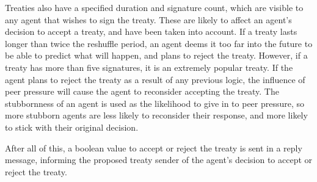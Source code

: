 Treaties also have a specified duration and signature count, which are visible to any agent that wishes to sign the treaty. These are likely to affect an agent’s decision to accept a treaty, and have been taken into account. If a treaty lasts longer than twice the reshuffle period, an agent deems it too far into the future to be able to predict what will happen, and plans to reject the treaty. However, if a treaty has more than five signatures, it is an extremely popular treaty. If the agent plans to reject the treaty as a result of any previous logic, the influence of peer pressure will cause the agent to reconsider accepting the treaty. The stubbornness of an agent is used as the likelihood to give in to peer pressure, so more stubborn agents are less likely to reconsider their response, and more likely to stick with their original decision.\par
After all of this, a boolean value to accept or reject the treaty is sent in a reply message, informing the proposed treaty sender of the agent’s decision to accept or reject the treaty.

